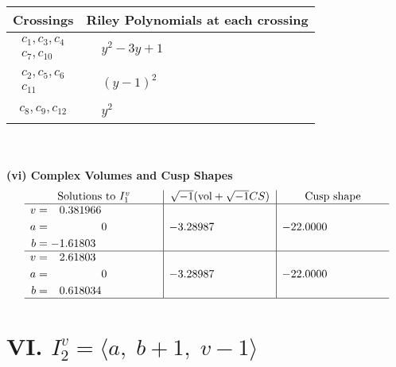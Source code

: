 \documentclass[1p]{elsarticle_modified}
\theoremstyle{definition}
\newcommand{\I}{\sqrt{-1}}
\begin{document}
\begin{tabular}{m{50pt}|m{274pt}}
Crossings & \hspace{64pt}Riley Polynomials at each crossing \\
\hline $$\begin{aligned}c_{1},c_{3},c_{4}\\c_{7},c_{10}\end{aligned}$$&$\begin{aligned}
&y^2-3 y+1
\end{aligned}$\\
\hline $$\begin{aligned}c_{2},c_{5},c_{6}\\c_{11}\end{aligned}$$&$\begin{aligned}
&(y-1)^2
\end{aligned}$\\
\hline $$\begin{aligned}c_{8},c_{9},c_{12}\end{aligned}$$&$\begin{aligned}
&y^2
\end{aligned}$\\
\hline
\end{tabular}\\~\\
\newpage\flushleft \textbf{(vi) Complex Volumes and Cusp Shapes}
$$\begin{array}{c|c|c}  
\text{Solutions to }I^v_{1}& \I (\text{vol} + \sqrt{-1}CS) & \text{Cusp shape}\\
 \hline 
\begin{aligned}
v &= \phantom{-}0.381966\phantom{ +0.000000I} \\
a &= \phantom{-0.000000 } 0 \\
b &= -1.61803\phantom{ +0.000000I}\end{aligned}
 & -3.28987\phantom{ +0.000000I} & -22.0000\phantom{ +0.000000I} \\ \hline\begin{aligned}
v &= \phantom{-}2.61803\phantom{ +0.000000I} \\
a &= \phantom{-0.000000 } 0 \\
b &= \phantom{-}0.618034\phantom{ +0.000000I}\end{aligned}
 & -3.28987\phantom{ +0.000000I} & -22.0000\phantom{ +0.000000I}\\
 \hline 
 \end{array}$$\newpage\newpage\renewcommand{\arraystretch}{1}
\centering \section*{VI. $I^v_{2}= \langle a,\;b+1,\;v-1 \rangle$}
\end{document}
